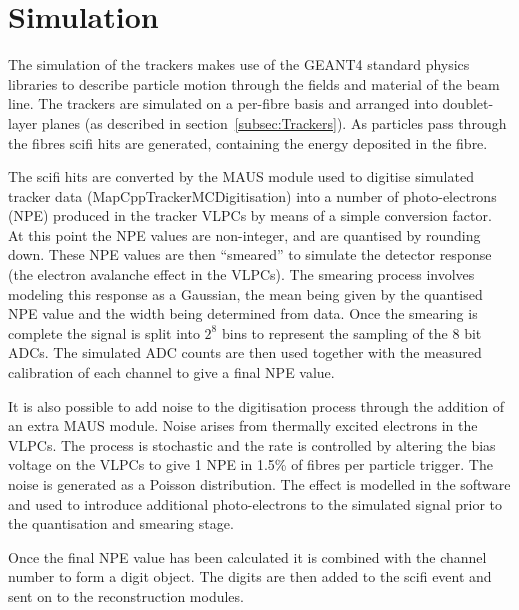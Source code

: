 \section{Simulation}
\label{sec:Simulation}

The simulation of the trackers makes use of the GEANT4 standard physics libraries to describe particle motion through the fields and material of the beam line. The trackers are simulated on a per-fibre basis and arranged into doublet-layer planes (as described in section~\ref{subsec:Trackers}). As particles pass through the fibres scifi hits are generated, containing the energy deposited in the fibre. 

The scifi hits are converted by the MAUS module used to digitise simulated tracker data (MapCppTrackerMCDigitisation) into a number of photo-electrons (NPE) produced in the tracker VLPCs by means of a simple conversion factor. At this point the NPE values are non-integer, and are quantised by rounding down. These NPE values are then ``smeared'' to simulate the detector response (the electron avalanche effect in the VLPCs). The smearing process involves modeling this response as a Gaussian, the mean being given by the quantised NPE value and the width being determined from data. Once the smearing is complete the signal is split into $2^8$ bins to represent the sampling of the 8 bit ADCs. The simulated ADC counts are then used together with the measured calibration of each channel to give a final NPE value.

It is also possible to add noise to the digitisation process through the addition of an extra MAUS module. Noise arises from thermally excited electrons in the VLPCs. The process is stochastic and the rate is controlled by altering the bias voltage on the VLPCs to give 1 NPE in 1.5\% of fibres per particle trigger. The noise is generated as a Poisson distribution. The effect is modelled in the software and used to introduce additional photo-electrons to the simulated signal prior to the quantisation and smearing stage. 

Once the final NPE value has been calculated it is combined with the channel number to form a digit object. The digits are then added to the scifi event and sent on to the reconstruction modules.




